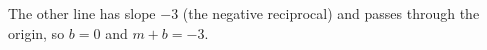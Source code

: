 The other line has slope $-3$ (the negative reciprocal) and passes through the origin, so $b=0$ and $m+b=\boxed{-3}$.
